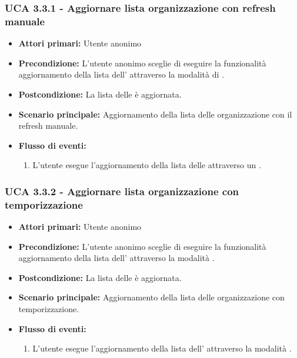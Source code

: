 \subsubsection{UCA 3.3.1 - Aggiornare lista organizzazione con refresh manuale}%
\begin{itemize}
	\item \textbf{Attori primari:} Utente anonimo
	\item \textbf{Precondizione:} L'utente anonimo sceglie di eseguire la funzionalità aggiornamento della lista dell' attraverso la modalità di .
	\item \textbf{Postcondizione:} La lista delle  è aggiornata.	
	\item \textbf{Scenario principale:} Aggiornamento della lista delle organizzazione con il refresh manuale.
	\item \textbf{Flusso di eventi:}
	\begin{enumerate}
		\item L'utente esegue l'aggiornamento della lista delle  attraverso un .
	\end{enumerate}
	
\end{itemize}

\subsubsection{UCA 3.3.2 - Aggiornare lista organizzazione con temporizzazione}%
\begin{itemize} 
	\item \textbf{Attori primari:} Utente anonimo
	\item \textbf{Precondizione:} L'utente anonimo sceglie di eseguire la funzionalità aggiornamento della lista dell' attraverso la modalità .
	\item \textbf{Postcondizione:} La lista delle  è aggiornata.
	\item \textbf{Scenario principale:} Aggiornamento della lista delle organizzazione con temporizzazione.
	\item \textbf{Flusso di eventi:}
	\begin{enumerate}
		\item L'utente esegue l'aggiornamento della lista dell' attraverso la modalità .
	\end{enumerate}
\end{itemize}

